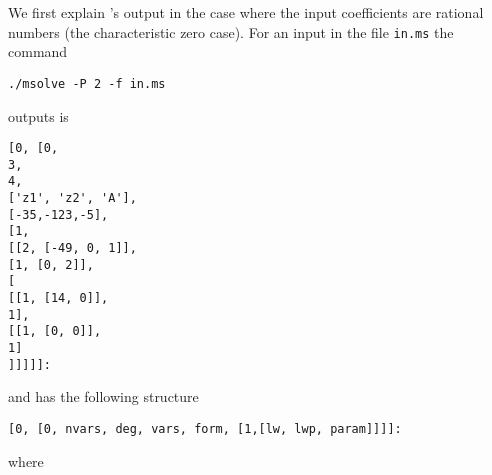 \documentclass[a4paper,english,11pt]{scrartcl}
\theoremstyle{definition}
\theoremstyle{remark}
\begin{document}
We first explain \msolve's output in the case where the input coefficients are 
rational numbers (the characteristic zero case).
For an input in the file \verb+in.ms+
the command
\begin{tcolorbox}
\begin{verbatim}
./msolve -P 2 -f in.ms
\end{verbatim}
\end{tcolorbox}
\msolve outputs is
\begin{tcolorbox}
  \begin{lstlisting}
[0, [0, 
3, 
4, 
['z1', 'z2', 'A'],
[-35,-123,-5],
[1,
[[2, [-49, 0, 1]],
[1, [0, 2]],
[
[[1, [14, 0]],
1],
[[1, [0, 0]],
1]
]]]]]:
  \end{lstlisting}
\end{tcolorbox}
and
has the following structure
\begin{tcolorbox}
  \begin{lstlisting}
[0, [0, nvars, deg, vars, form, [1,[lw, lwp, param]]]]:
  \end{lstlisting}
\end{tcolorbox}
where
\end{document}
